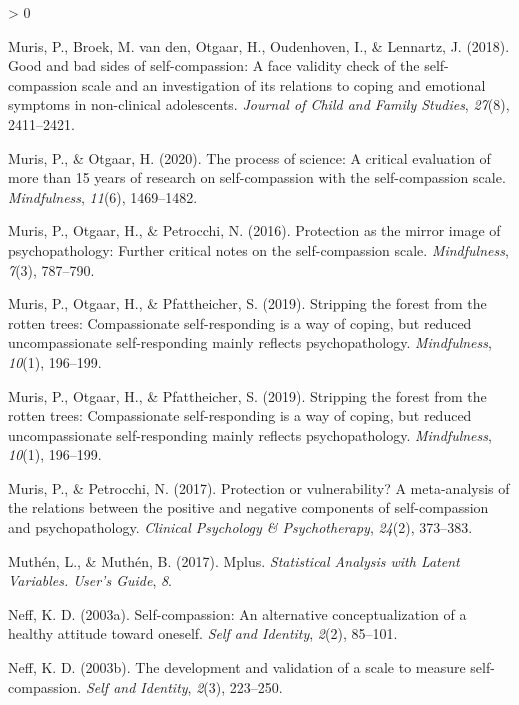 \documentclass[
  english,
  man,floatsintext]{apa7}
\newlength{\cslhangindent}
\newenvironment{CSLReferences}[2] %
 {%
  \setlength{\parindent}{0pt}
  \ifodd #1 \everypar{\setlength{\hangindent}{\cslhangindent}}\ignorespaces\fi
  \ifnum #2 > 0
  \setlength{\parskip}{#2\baselineskip}
  \fi
 }%
 {}
\begin{document}
\begin{CSLReferences}{1}{0}
\leavevmode\hypertarget{ref-muris2018good}{}%
Muris, P., Broek, M. van den, Otgaar, H., Oudenhoven, I., \& Lennartz, J. (2018). Good and bad sides of self-compassion: A face validity check of the self-compassion scale and an investigation of its relations to coping and emotional symptoms in non-clinical adolescents. \emph{Journal of Child and Family Studies}, \emph{27}(8), 2411--2421.

\leavevmode\hypertarget{ref-muris2020process}{}%
Muris, P., \& Otgaar, H. (2020). The process of science: A critical evaluation of more than 15 years of research on self-compassion with the self-compassion scale. \emph{Mindfulness}, \emph{11}(6), 1469--1482.

\leavevmode\hypertarget{ref-muris2016protection}{}%
Muris, P., Otgaar, H., \& Petrocchi, N. (2016). Protection as the mirror image of psychopathology: Further critical notes on the self-compassion scale. \emph{Mindfulness}, \emph{7}(3), 787--790.

\leavevmode\hypertarget{ref-muris2019stripping}{}%
Muris, P., Otgaar, H., \& Pfattheicher, S. (2019). Stripping the forest from the rotten trees: Compassionate self-responding is a way of coping, but reduced uncompassionate self-responding mainly reflects psychopathology. \emph{Mindfulness}, \emph{10}(1), 196--199.

\leavevmode\hypertarget{ref-muris2019stripping}{}%
Muris, P., Otgaar, H., \& Pfattheicher, S. (2019). Stripping the forest from the rotten trees: Compassionate self-responding is a way of coping, but reduced uncompassionate self-responding mainly reflects psychopathology. \emph{Mindfulness}, \emph{10}(1), 196--199.

\leavevmode\hypertarget{ref-muris2017protection}{}%
Muris, P., \& Petrocchi, N. (2017). Protection or vulnerability? A meta-analysis of the relations between the positive and negative components of self-compassion and psychopathology. \emph{Clinical Psychology \& Psychotherapy}, \emph{24}(2), 373--383.

\leavevmode\hypertarget{ref-muthen2017mplus}{}%
Muthén, L., \& Muthén, B. (2017). Mplus. \emph{Statistical Analysis with Latent Variables. User's Guide}, \emph{8}.

\leavevmode\hypertarget{ref-neff2003self}{}%
Neff, K. D. (2003a). Self-compassion: An alternative conceptualization of a healthy attitude toward oneself. \emph{Self and Identity}, \emph{2}(2), 85--101.

\leavevmode\hypertarget{ref-neff2003development}{}%
Neff, K. D. (2003b). The development and validation of a scale to measure self-compassion. \emph{Self and Identity}, \emph{2}(3), 223--250.


\end{CSLReferences}
\end{document}
